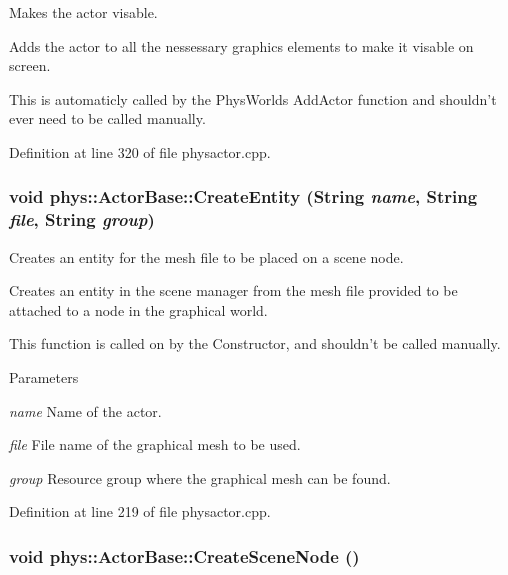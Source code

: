 Makes the actor visable. 

Adds the actor to all the nessessary graphics elements to make it visable on screen. \par
 This is automaticly called by the PhysWorlds AddActor function and shouldn't ever need to be called manually. 

Definition at line 320 of file physactor.cpp.

\hypertarget{classphys_1_1ActorBase_aff7dbb190fb982a43123bee3066501c4}{
\subsubsection[{CreateEntity}]{\setlength{\rightskip}{0pt plus 5cm}void phys::ActorBase::CreateEntity ({\bf String} {\em name}, \/  {\bf String} {\em file}, \/  {\bf String} {\em group})}}
\label{d8/d0f/classphys_1_1ActorBase_aff7dbb190fb982a43123bee3066501c4}


Creates an entity for the mesh file to be placed on a scene node. 

Creates an entity in the scene manager from the mesh file provided to be attached to a node in the graphical world. \par
 This function is called on by the Constructor, and shouldn't be called manually. 
\begin{DoxyParams}{Parameters}
\item[{\em name}]Name of the actor. \item[{\em file}]File name of the graphical mesh to be used. \item[{\em group}]Resource group where the graphical mesh can be found. \end{DoxyParams}


Definition at line 219 of file physactor.cpp.

\hypertarget{classphys_1_1ActorBase_a125d6f0a0b4072e64490638c074eea2d}{
\subsubsection[{CreateSceneNode}]{\setlength{\rightskip}{0pt plus 5cm}void phys::ActorBase::CreateSceneNode ()}}
\label{d8/d0f/classphys_1_1ActorBase_a125d6f0a0b4072e64490638c074eea2d}


